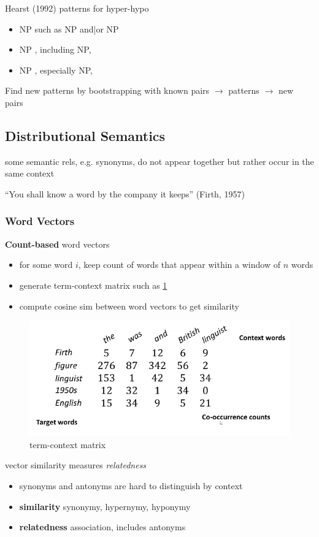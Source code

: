 \documentclass[]{article}
\theoremstyle{definition}
\begin{document}
Hearst (1992) patterns for hyper-hypo
\begin{itemize}
    \item NP such as {NP} {and|or} NP
    \item NP {,} including {NP,}
    \item NP {,} especially {NP,}
\end{itemize}

Find new patterns by bootstrapping with known pairs $\to$ patterns $\to$ new pairs

\subsection{Distributional Semantics}%
\label{sub:distributional_semantics}

some semantic rels, e.g. synonyms, do not appear together but rather occur in the same context

``You shall know a word by the company it keeps'' (Firth, 1957)

\subsubsection{Word Vectors}%
\label{ssub:word_vectors}

\textbf{Count-based} word vectors
\begin{itemize}
    \item for some word $i$, keep count of words that appear within a window of $n$ words
    \item generate term-context matrix such as \ref{fig:term-context}
    \item compute cosine sim between word vectors to get similarity
\end{itemize}

\begin{figure}[h]
    \centering
    \includegraphics[width=0.6\linewidth]{comp550/term-context.png}
    \caption{term-context matrix}%
    \label{fig:term-context}
\end{figure}

vector similarity measures \textit{relatedness}
\begin{itemize}
    \item synonyms and antonyms are hard to distinguish by context
    \item \textbf{similarity} synonymy, hypernymy, hyponymy
    \item \textbf{relatedness} association, includes antonyms
\end{itemize}
\end{document}
